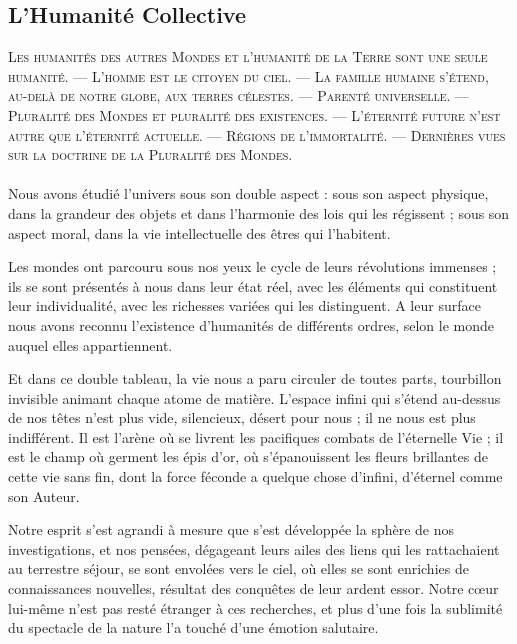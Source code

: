 \documentclass[a4paper, 11pt, oneside, landscape]{article}
\begin{document}
\subsection{L'Humanité Collective}
\begin{center}
\scshape
\small
Les humanités des autres Mondes et l'humanité de la Terre sont une seule humanité. --- L'homme est le citoyen du ciel. --- La famille humaine s'étend, au-delà de notre globe, aux terres célestes. --- Parenté universelle. --- Pluralité des Mondes et pluralité des existences. --- L'éternité future n'est autre que l'éternité actuelle. --- Régions de l'immortalité. --- Dernières vues sur la doctrine de la Pluralité des Mondes.
\end{center}
\paragraph{}
Nous avons étudié l'univers sous son double aspect : sous son aspect physique, dans la grandeur des objets et dans l'harmonie des lois qui les régissent ; sous son aspect moral, dans la vie intellectuelle des êtres qui l'habitent.

Les mondes ont parcouru sous nos yeux le cycle de leurs révolutions immenses ; ils se sont présentés à nous dans leur état réel, avec les éléments qui constituent leur individualité, avec les richesses variées qui les distinguent. A leur surface nous avons reconnu l'existence d'humanités de différents ordres, selon le monde auquel elles appartiennent.

Et dans ce double tableau, la vie nous a paru circuler de toutes parts, tourbillon invisible animant chaque atome de matière. L'espace infini qui s'étend au-dessus de nos têtes n'est plus vide, silencieux, désert pour nous ; il ne nous est plus indifférent. Il est l'arène où se livrent les pacifiques combats de l'éternelle Vie ; il est le champ où germent les épis d'or, où s'épanouissent les fleurs brillantes de cette vie sans fin, dont la force féconde a quelque chose d'infini, d'éternel comme son Auteur.

Notre esprit s'est agrandi à mesure que s'est développée la sphère de nos investigations, et nos pensées, dégageant leurs ailes des liens qui les rattachaient au terrestre séjour, se sont envolées vers le ciel, où elles se sont enrichies de connaissances nouvelles, résultat des conquêtes de leur ardent essor. Notre cœur lui-même n'est pas resté étranger à ces recherches, et plus d'une fois la sublimité du spectacle de la nature l'a touché d'une émotion salutaire.
\end{document}
